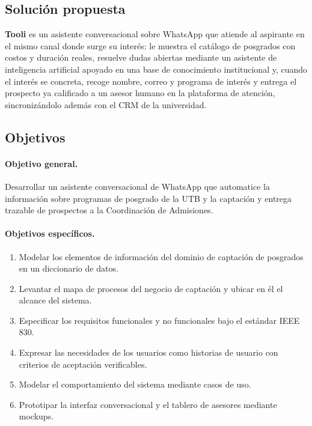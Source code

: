 \documentclass[12pt,a4paper]{report}
\begin{document}
\subsection{Solución propuesta}

\textbf{Tooli} es un asistente conversacional sobre WhatsApp que atiende al aspirante en el mismo
canal donde surge su interés: le muestra el catálogo de posgrados con costos y duración reales,
resuelve dudas abiertas mediante un asistente de inteligencia artificial apoyado en una base de
conocimiento institucional y, cuando el interés se concreta, recoge nombre, correo y programa
de interés y entrega el prospecto ya calificado a un asesor humano en la plataforma de atención,
sincronizándolo además con el CRM de la universidad.

\subsection{Objetivos}

\paragraph{Objetivo general.} Desarrollar un asistente conversacional de WhatsApp que automatice la
información sobre programas de posgrado de la UTB y la captación y entrega trazable de prospectos a
la Coordinación de Admisiones.

\paragraph{Objetivos específicos.}
\begin{enumerate}[itemsep=2pt]
    \item Modelar los elementos de información del dominio de captación de posgrados en un
    diccionario de datos.
    \item Levantar el mapa de procesos del negocio de captación y ubicar en él el alcance del
    sistema.
    \item Especificar los requisitos funcionales y no funcionales bajo el estándar IEEE 830.
    \item Expresar las necesidades de los usuarios como historias de usuario con criterios de
    aceptación verificables.
    \item Modelar el comportamiento del sistema mediante casos de uso.
    \item Prototipar la interfaz conversacional y el tablero de asesores mediante mockups.
\end{enumerate}
\end{document}
